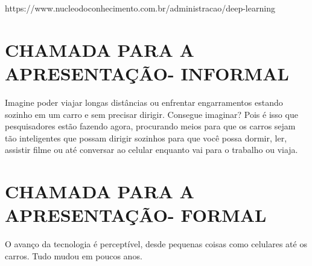 \documentclass[12pt,a4paper]{article}
\begin{document}









    https://www.nucleodoconhecimento.com.br/administracao/deep-learning
\newpage
\section{CHAMADA PARA A APRESENTAÇÃO- INFORMAL}
Imagine poder viajar longas distâncias ou enfrentar engarramentos estando sozinho em um carro e sem precisar dirigir. Consegue imaginar? Pois é isso que pesquisadores estão fazendo agora, procurando meios para que os carros sejam tão inteligentes que possam dirigir sozinhos para que você possa dormir, ler, assistir filme ou até conversar ao celular enquanto vai para o trabalho ou viaja.





\newpage
\section{CHAMADA PARA A APRESENTAÇÃO- FORMAL}
O avanço da tecnologia é perceptível, desde pequenas coisas como celulares até os carros. Tudo mudou em poucos anos. 
\end{document}
